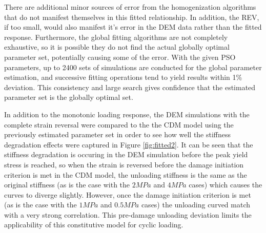 There are additional minor sources of error from the homogenization algorithms that do not manifest themselves in this fitted relationship.  In addition, the REV, if too small, would also manifest it's error in the DEM data rather than the fitted response. Furthermore, the global fitting algorithms are not completely exhaustive, so it is possible they do not find the actual globally optimal parameter set, potentially causing some of the error. With the given PSO parameters, up to 2400 sets of simulations are conducted for the global parameter estimation, and successive fitting operations tend to yield results within 1\% deviation. This consistency and large search gives confidence that the estimated parameter set is the globally optimal set. 

In addition to the monotonic loading response, the DEM simulations with the complete strain reversal were compared to the the CDM model using the previously estimated parameter set in order to see how well the stiffness degradation effects were captured in Figure \ref{fig:fitted2}. It can be seen that the stiffness degradation is occuring in the DEM simulation before the peak yield stress is reached, so when the strain is reversed  before the damage initiation criterion is met in the CDM model, the unloading stiffness is the same as the original stiffness (as is the case with the $2MPa$ and $4MPa$ cases) which causes the curves to diverge slightly. However, once the damage initiation criterion is met (as is the case with the $1MPa$ and $0.5MPa$ cases) the unloading curved match with a very strong correlation. This pre-damage unloading deviation limits the applicability of this constitutive model for cyclic loading.